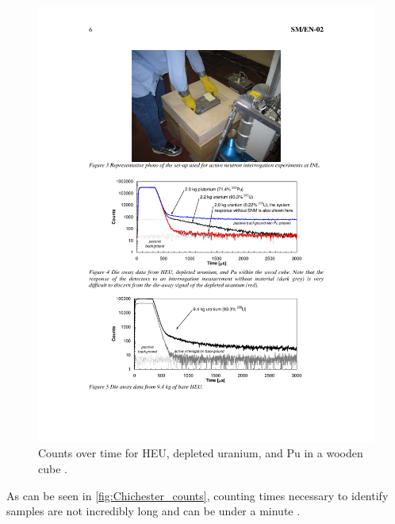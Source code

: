 \documentclass{report}
\begin{document}
\begin{figure}
 \centering
 \includegraphics[trim = 3cm 11.3cm 3cm 10.5cm, clip,scale=1]{./figures/Chichester_counts.pdf}
   \caption{Counts over time for HEU, depleted uranium, and Pu in a wooden cube \cite{Chichester2009}.}
     \label{fig:Chichester_counts}
\end{figure}



As can be seen in \autoref{fig:Chichester_counts}, counting times necessary to identify samples are not incredibly long and can be under a minute \cite{Chichester2009}.
\end{document}
